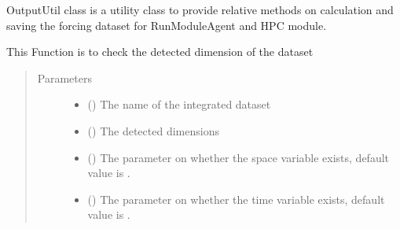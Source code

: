 \documentclass[letterpaper,10pt,english]{sphinxmanual}
\begin{document}
\begin{fulllineitems}
\label{\detokenize{AgentTools.util:AgentTools.util.OutputUtil.OutputUtil}}
OutputUtil class is a utility class to provide relative methods on calculation and saving the forcing dataset for RunModuleAgent and HPC module.

\begin{fulllineitems}
\label{\detokenize{AgentTools.util:AgentTools.util.OutputUtil.OutputUtil.check_dimensions}}
This Function is to check the detected dimension of the dataset
\begin{quote}\begin{description}
\item[{Parameters}] \leavevmode\begin{itemize}
\item {} 
 () \textendash{} The name of the integrated dataset

\item {} 
 () \textendash{} The detected dimensions

\item {} 
 () \textendash{} The parameter on whether the space variable exists, default value is .

\item {} 
 () \textendash{} The parameter on whether the time variable exists, default value is .


\end{itemize}
\end{description}
\end{quote}
\end{fulllineitems}
\end{fulllineitems}
\end{document}
